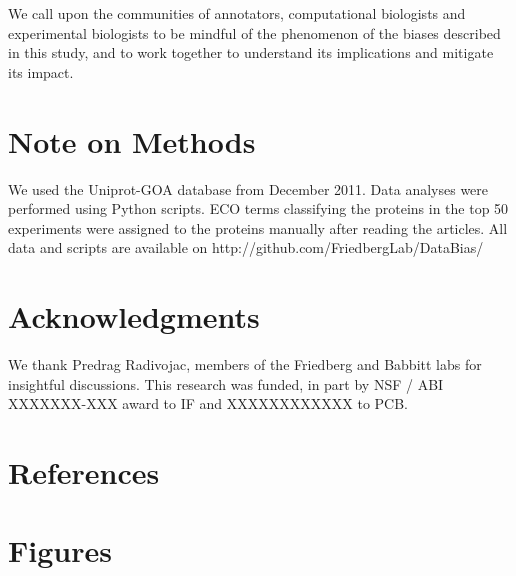 \documentclass[12pt]{article}
\begin{document}
We call upon the communities of annotators, computational biologists and experimental biologists to
be mindful of the phenomenon of the biases described in this study, and to work together to
understand its implications and mitigate its impact.


\section*{Note on Methods}
We used the Uniprot-GOA database from December 2011. Data analyses were performed using Python scripts.
ECO terms classifying the proteins in the top 50 experiments were assigned to the proteins
manually after reading the articles. All data and scripts are available on
http://github.com/FriedbergLab/DataBias/

\section*{Acknowledgments}
We thank Predrag Radivojac, members of the Friedberg and Babbitt labs for insightful discussions.
This research was funded, in part by NSF / ABI XXXXXXX-XXX award to IF and XXXXXXXXXXXX to PCB.

\section*{References}

\newpage
\section*{Figures}
\end{document}
